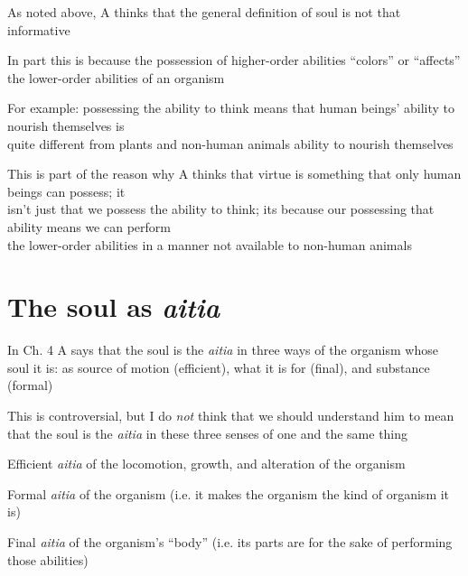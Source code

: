 \documentclass[11pt]{article}
\begin{document}
\noindent As noted above, A thinks that the general definition of soul is not that informative
\vspace*{2mm}

\noindent In part this is because the possession of higher-order abilities ``colors'' or ``affects'' the lower-order abilities of an organism
\vspace*{1mm}

For example: possessing the ability to think means that human beings' ability to nourish themselves is\\\hspace*{6mm}quite different from plants and non-human animals ability to nourish themselves
\vspace*{1mm}

This is part of the reason why A thinks that virtue is something that only human beings can possess; it\\\hspace*{6mm}isn't just that we possess the ability to think; its because our possessing that ability means we can perform\\\hspace*{6mm}the lower-order abilities in a manner not available to non-human animals

\section*{The soul as \emph{aitia}}

\noindent In Ch. 4 A says that the soul is the \emph{aitia} in three ways of the organism whose soul it is: as source of motion (efficient), what it is for (final), and substance (formal)
\vspace*{2mm}

\noindent This is controversial, but I do \emph{not} think that we should understand him to mean that the soul is the \emph{aitia} in these three senses of one and the same thing
\vspace*{2mm}

Efficient \emph{aitia} of the locomotion, growth, and alteration of the organism
\vspace*{1mm}

Formal \emph{aitia} of the organism (i.e. it makes the organism the kind of organism it is)
\vspace*{1mm}

Final \emph{aitia} of the organism's ``body'' (i.e. its parts are for the sake of performing those abilities)
\end{document}
